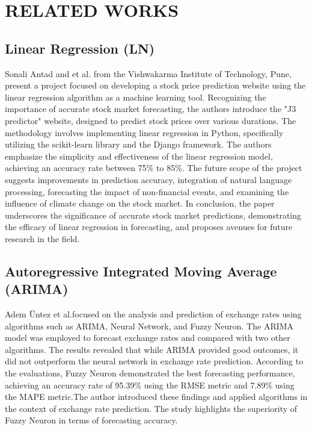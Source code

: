 \documentclass{ieeeojies}
\begin{document}
\section{\centering RELATED WORKS}
\subsection{\textbf{Linear Regression (LN)}}
 \hspace{0.3cm}Sonali Antad and et al. \cite{antad2023stock} from the Vishwakarma Institute of Technology, Pune, present a project focused on developing a stock price prediction website using the linear regression algorithm as a machine learning tool. Recognizing the importance of accurate stock market forecasting, the authors introduce the "J3 predictor" website, designed to predict stock prices over various durations. The methodology involves implementing linear regression in Python, specifically utilizing the scikit-learn library and the Django framework. The authors emphasize the simplicity and effectiveness of the linear regression model, achieving an accuracy rate between 75\% to 85\%. The future scope of the project suggests improvements in prediction accuracy, integration of natural language processing, forecasting the impact of non-financial events, and examining the influence of climate change on the stock market. In conclusion, the paper underscores the significance of accurate stock market predictions, demonstrating the efficacy of linear regression in forecasting, and proposes avenues for future research in the field. 

\subsection{\textbf{Autoregressive Integrated Moving Average (ARIMA)}}
\hspace{0.3cm}
Adem Üntez et al.\cite{babu2015exchange}focused on the analysis and prediction of exchange rates using algorithms such as ARIMA, Neural Network, and Fuzzy Neuron. The ARIMA model was employed to forecast exchange rates and compared with two other algorithms. The results revealed that while ARIMA provided good outcomes, it did not outperform the neural network in exchange rate prediction. According to the evaluations, Fuzzy Neuron demonstrated the best forecasting performance, achieving an accuracy rate of 95.39\% using the RMSE metric and 7.89\% using the MAPE metric.The author introduced these findings and applied algorithms in the context of exchange rate prediction. The study highlights the superiority of Fuzzy Neuron in terms of forecasting accuracy.
\end{document}
